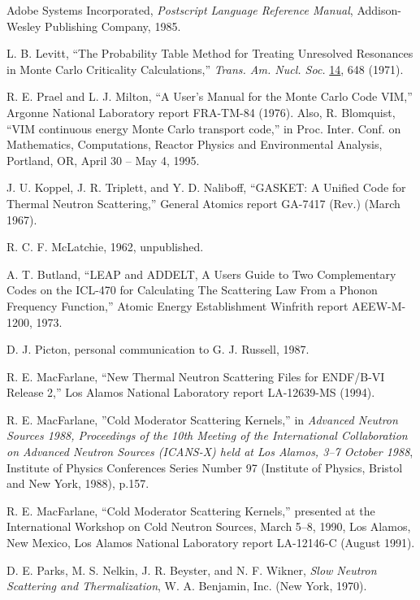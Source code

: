 \documentclass[11pt,twoside]{NJOYMan}
\begin{document}
\begin{thebibliography}{99}
\begin{singlespace}
 Adobe Systems Incorporated, {\it Postscript
  Language Reference Manual}, Addison-Wesley Publishing Company, 1985.

 L. B. Levitt, ``The Probability Table Method
  for Treating Unresolved Resonances in Monte Carlo Criticality
  Calculations,'' {\it Trans. Am. Nucl. Soc.} \underline{14}, 648 (1971).

 R. E. Prael and L. J. Milton, ``A User's Manual
  for the Monte Carlo Code VIM,'' Argonne National Laboratory
  report FRA-TM-84 (1976).  Also, R. Blomquist, ``VIM continuous
  energy Monte Carlo transport code,'' in Proc. Inter. Conf. on
  Mathematics, Computations, Reactor Physics and Environmental
  Analysis, Portland, OR, April 30 -- May 4, 1995.

 J. U. Koppel, J. R. Triplett, and Y. D. Naliboff,
  ``GASKET: A Unified Code for Thermal Neutron Scattering,''
  General Atomics report GA-7417 (Rev.) (March 1967).

 R. C. F. McLatchie, 1962, unpublished.

 A. T. Butland, ``LEAP and ADDELT, A Users Guide
  to Two Complementary Codes on the ICL-470 for Calculating The Scattering
  Law From a Phonon Frequency Function,''       Atomic Energy Establishment
  Winfrith report AEEW-M-1200, 1973.

 D. J. Picton, personal communication to G. J. Russell, 1987.

 R. E. MacFarlane, ``New Thermal Neutron Scattering Files
  for ENDF/B-VI Release 2,'' Los Alamos National Laboratory report
  LA-12639-MS (1994).

 R. E. MacFarlane, ''Cold Moderator Scattering
  Kernels,'' in {\it Advanced Neutron Sources 1988, Proceedings of
  the 10th Meeting of the International Collaboration on Advanced
  Neutron Sources (ICANS-X) held at Los Alamos, 3--7 October 1988},
  Institute of Physics Conferences Series Number 97 (Institute of
  Physics, Bristol and New York, 1988), p.157.

 R. E. MacFarlane, ``Cold Moderator Scattering
  Kernels,'' presented at the International Workshop on Cold Neutron
  Sources, March 5--8, 1990, Los Alamos, New Mexico, Los Alamos
  National Laboratory report LA-12146-C (August 1991).

 D. E. Parks,
  M.  S. Nelkin, J. R. Beyster, and N. F. Wikner,
  {\it Slow Neutron Scattering and Thermalization}, W. A. Benjamin, Inc.
  (New York, 1970).


\end{singlespace}
\end{thebibliography}
\end{document}
